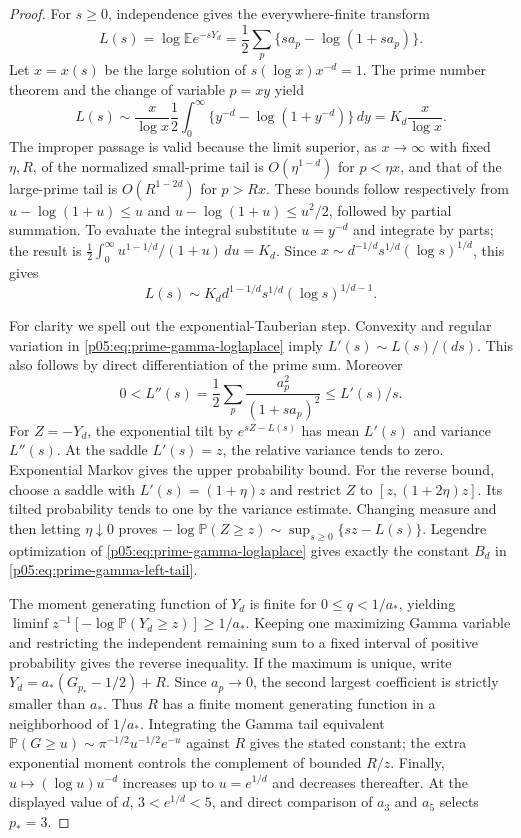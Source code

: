 \documentclass[11pt,letterpaper]{article}
\theoremstyle{definition}
\theoremstyle{remark}
\newcommand{\1}{\mathbf 1}
\begin{document}
\begin{proof}
For $s\ge0$, independence gives the everywhere-finite transform
\[
 L(s)=\log\mathbb E e^{-sY_d}
 =\frac12\sum_p\{sa_p-\log(1+sa_p)\}.
\]
Let $x=x(s)$ be the large solution of $s(\log x)x^{-d}=1$.
The prime number theorem and the change of variable $p=xy$ yield
\[
 L(s)\sim\frac{x}{\log x}\frac12
 \int_0^\infty\{y^{-d}-\log(1+y^{-d})\}\,dy
 =K_d\frac{x}{\log x}.
\]
The improper passage is valid because the limit superior, as
$x\to\infty$ with fixed $\eta,R$, of the normalized small-prime
tail is $O(\eta^{1-d})$ for $p<\eta x$, and that of the large-prime
tail is $O(R^{1-2d})$ for $p>Rx$. These bounds follow respectively
from $u-\log(1+u)\le u$ and
$u-\log(1+u)\le u^2/2$, followed by partial summation.
To evaluate the integral substitute $u=y^{-d}$ and integrate by
parts; the result is
$\frac12\int_0^\infty u^{1-1/d}/(1+u)\,du=K_d$.
Since
$x\sim d^{-1/d}s^{1/d}(\log s)^{1/d}$, this gives
\begin{equation}\label{p05:eq:prime-gamma-loglaplace}
 L(s)\sim K_dd^{1-1/d}s^{1/d}(\log s)^{1/d-1}.
\end{equation}

For clarity we spell out the exponential-Tauberian step.
Convexity and regular variation in
\eqref{p05:eq:prime-gamma-loglaplace} imply
$L'(s)\sim L(s)/(ds)$.  This also follows by direct differentiation
of the prime sum.  Moreover
\[
 0<L''(s)=\frac12\sum_p\frac{a_p^2}{(1+sa_p)^2}
 \le L'(s)/s.
\]
For $Z=-Y_d$, the exponential tilt by $e^{sZ-L(s)}$ has mean
$L'(s)$ and variance $L''(s)$.  At the saddle $L'(s)=z$, the
relative variance tends to zero.  Exponential Markov gives the
upper probability bound.  For the reverse bound, choose a saddle
with $L'(s)=(1+\eta)z$ and restrict $Z$ to
$[z,(1+2\eta)z]$.  Its tilted probability tends to one by the
variance estimate.  Changing measure and then letting
$\eta\downarrow0$ proves
$-\log\mathbb P(Z\ge z)\sim\sup_{s\ge0}\{sz-L(s)\}$.
Legendre optimization of \eqref{p05:eq:prime-gamma-loglaplace} gives
exactly the constant $B_d$ in
\eqref{p05:eq:prime-gamma-left-tail}.

The moment generating function of $Y_d$ is finite for
$0\le q<1/a_*$, yielding
$\liminf z^{-1}[-\log\mathbb P(Y_d\ge z)]\ge1/a_*$.
Keeping one maximizing Gamma variable and restricting the
independent remaining sum to a fixed interval of positive
probability gives the reverse inequality.
If the maximum is unique, write
$Y_d=a_*(G_{p_*}-1/2)+R$.
Since $a_p\to0$, the second largest coefficient is strictly smaller
than $a_*$.  Thus $R$ has a finite moment generating function in a
neighborhood of $1/a_*$.  Integrating the Gamma tail equivalent
$\mathbb P(G\ge u)\sim\pi^{-1/2}u^{-1/2}e^{-u}$ against $R$
gives the stated constant; the extra exponential moment controls
the complement of bounded $R/z$.
Finally, $u\mapsto(\log u)u^{-d}$ increases up to $u=e^{1/d}$
and decreases thereafter.  At the displayed value of $d$,
$3<e^{1/d}<5$, and direct comparison of $a_3$ and $a_5$ selects
$p_*=3$.
\end{proof}
\end{document}
